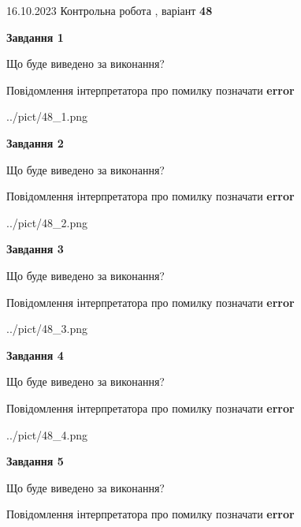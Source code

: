 \documentclass[12pt, ukrainian]{article}
\begin{document}
{\Large{16.10.2023 Контрольна робота , варіант  \No \textbf { 48 }\par}}
{
\begin {large}
{\begin {center}\textbf{Завдання 1}\end {center}}\par
Що буде виведено за виконання? \par
Повідомлення інтерпретатора про помилку позначати \textbf{error}

\begin{center}
	{../pict/48_1.png}
\end{center}
\newpage

{\begin {center}\textbf{Завдання 2}\end {center}}\par
Що буде виведено за виконання? \par
Повідомлення інтерпретатора про помилку позначати \textbf{error}

\begin{center}
	{../pict/48_2.png}
\end{center}
\newpage

{\begin {center}\textbf{Завдання 3}\end {center}}\par
Що буде виведено за виконання? \par
Повідомлення інтерпретатора про помилку позначати \textbf{error}

\begin{center}
	{../pict/48_3.png}
\end{center}
\newpage

{\begin {center}\textbf{Завдання 4}\end {center}}\par
Що буде виведено за виконання? \par
Повідомлення інтерпретатора про помилку позначати \textbf{error}

\begin{center}
	{../pict/48_4.png}
\end{center}
\newpage

{\begin {center}\textbf{Завдання 5}\end {center}}\par
Що буде виведено за виконання? \par
Повідомлення інтерпретатора про помилку позначати \textbf{error}


\end{large}}
\end{document}

